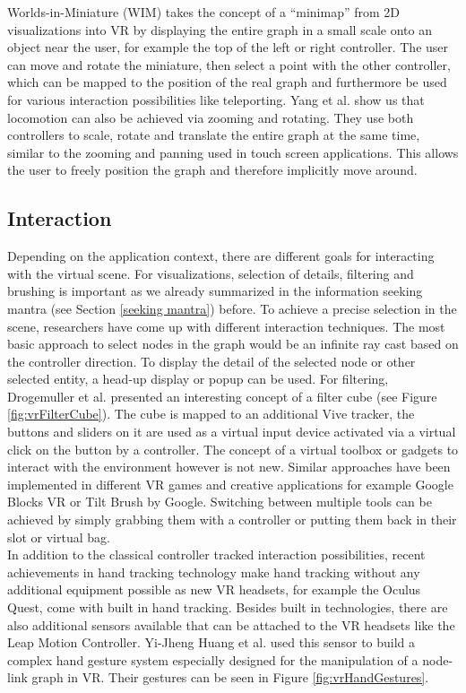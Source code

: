 Worlds-in-Miniature (WIM) \cite{drogemuller_examining_2020} takes the concept of a “minimap” from 2D visualizations into VR by displaying the entire graph in a small scale onto an object near the user, for example the top of the left or right controller. The user can move and rotate the miniature, then select a point with the other controller, which can be mapped to the position of the real graph and furthermore be used for various interaction possibilities like teleporting. Yang et al. \cite{yang_embodied_2020} show us that locomotion can also be achieved via zooming and rotating. They use both controllers to scale, rotate and translate the entire graph at the same time, similar to the zooming and panning used in touch screen applications. This allows the user to freely position the graph and therefore implicitly move around.

\subsection{Interaction}
\label{chap:rw-vrinteraction}

Depending on the application context, there are different goals for interacting with the virtual scene. For visualizations, selection of details, filtering and brushing is important as we already summarized in the information seeking mantra (see Section \ref{seeking mantra}) before. To achieve a precise selection in the scene, researchers have come up with different interaction techniques. The most basic approach to select nodes in the graph would be an infinite ray cast based on the controller direction. To display the detail of the selected node or other selected entity, a head-up display or popup can be used. 
For filtering, Drogemuller et al. \cite{drogemuller_vrige_2017} presented an interesting concept of a filter cube (see Figure \ref{fig:vrFilterCube}). The cube is mapped to an additional Vive tracker, the buttons and sliders on it are used as a virtual input device activated via a virtual click on the button by a controller. 
The concept of a virtual toolbox or gadgets to interact with the environment however is not new. Similar approaches have been implemented in different VR games and creative applications for example Google Blocks VR or Tilt Brush by Google. Switching between multiple tools can be achieved by simply grabbing them with a controller or putting them back in their slot or virtual bag.\\
In addition to the classical controller tracked interaction possibilities, recent achievements in hand tracking technology make hand tracking without any additional equipment possible as new VR headsets, for example the Oculus Quest, come with built in hand tracking. Besides built in technologies, there are also additional sensors available that can be attached to the VR headsets like the Leap Motion Controller. Yi-Jheng Huang et al. \cite{yi-jheng_huang_gesture_2017} used this sensor to build a complex hand gesture system especially designed for the manipulation of a node-link graph in VR. Their gestures can be seen in Figure \ref{fig:vrHandGestures}. 

